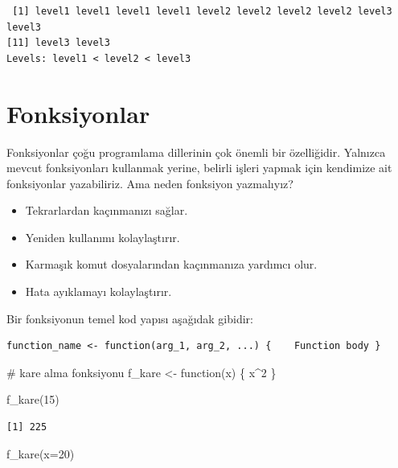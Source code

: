 \documentclass[
  letterpaper,
  DIV=11,
  numbers=noendperiod]{scrreprt}
\newenvironment{Shaded}{\begin{snugshade}}{\end{snugshade}}
\newcommand{\AttributeTok}[1]{\textcolor[rgb]{0.40,0.45,0.13}{#1}}
\newcommand{\CommentTok}[1]{\textcolor[rgb]{0.37,0.37,0.37}{#1}}
\newcommand{\ControlFlowTok}[1]{\textcolor[rgb]{0.00,0.23,0.31}{#1}}
\newcommand{\DecValTok}[1]{\textcolor[rgb]{0.68,0.00,0.00}{#1}}
\newcommand{\FunctionTok}[1]{\textcolor[rgb]{0.28,0.35,0.67}{#1}}
\newcommand{\NormalTok}[1]{\textcolor[rgb]{0.00,0.23,0.31}{#1}}
\newcommand{\OtherTok}[1]{\textcolor[rgb]{0.00,0.23,0.31}{#1}}
\newcommand{\SpecialCharTok}[1]{\textcolor[rgb]{0.37,0.37,0.37}{#1}}
\begin{document}
\begin{verbatim}
 [1] level1 level1 level1 level1 level2 level2 level2 level2 level3 level3
[11] level3 level3
Levels: level1 < level2 < level3
\end{verbatim}

\hypertarget{fonksiyonlar}{%
\chapter{Fonksiyonlar}\label{fonksiyonlar}}

Fonksiyonlar çoğu programlama dillerinin çok önemli bir özelliğidir.
Yalnızca mevcut fonksiyonları kullanmak yerine, belirli işleri yapmak
için kendimize ait fonksiyonlar yazabiliriz. Ama neden fonksiyon
yazmalıyız?

\begin{itemize}
\item
  Tekrarlardan kaçınmanızı sağlar.
\item
  Yeniden kullanımı kolaylaştırır.
\item
  Karmaşık komut dosyalarından kaçınmanıza yardımcı olur.
\item
  Hata ayıklamayı kolaylaştırır.
\end{itemize}

Bir fonksiyonun temel kod yapısı aşağıdak gibidir:

\begin{verbatim}
function_name <- function(arg_1, arg_2, ...) {    Function body }
\end{verbatim}

\begin{Shaded}
\begin{Highlighting}[]
\CommentTok{\# kare alma fonksiyonu}
\NormalTok{f\_kare }\OtherTok{\textless{}{-}} \ControlFlowTok{function}\NormalTok{(x) \{}
\NormalTok{   x}\SpecialCharTok{\^{}}\DecValTok{2}
\NormalTok{ \}}

\FunctionTok{f\_kare}\NormalTok{(}\DecValTok{15}\NormalTok{)}
\end{Highlighting}
\end{Shaded}

\begin{verbatim}
[1] 225
\end{verbatim}

\begin{Shaded}
\begin{Highlighting}[]
\FunctionTok{f\_kare}\NormalTok{(}\AttributeTok{x=}\DecValTok{20}\NormalTok{)}
\end{Highlighting}
\end{Shaded}
\end{document}
